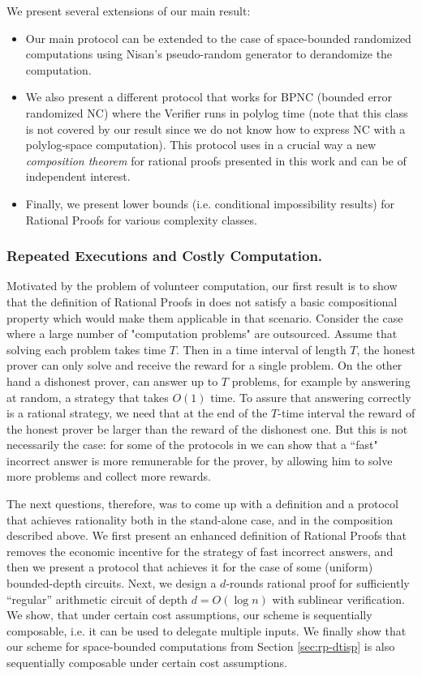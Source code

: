 We present several extensions of our main result:
\begin{itemize}
	
	\item Our main protocol can be extended to the case of space-bounded randomized computations using Nisan's 
	pseudo-random generator \cite{nisan1992pseudorandom} to derandomize the computation. 
	\item We also present a different protocol that works for BPNC (bounded error randomized NC) where the Verifier runs in polylog time (note that this class is not covered by our result since we do not know how to express NC with a polylog-space computation). This protocol uses in a crucial way a new {\em composition theorem} for rational proofs presented in this work and can be of independent interest. 
	\item Finally, we present lower bounds (i.e. conditional impossibility results) for Rational Proofs for various complexity classes.
\end{itemize}



\subsubsection{Repeated Executions and Costly Computation.}
Motivated by the problem of volunteer computation, our first
result is to show that the definition of Rational Proofs in \cite{am,am1} does not satisfy a basic compositional property which would make them applicable 
in that scenario. 
Consider the case where a large number of "computation problems" are outsourced. Assume that solving each problem takes time $T$. Then in a time interval of length $T$, the honest prover can only solve and receive the reward for a single problem. On the other hand a dishonest prover, can answer up to $T$ problems, for example by answering at random, a strategy that takes $O(1)$ time. To assure that answering correctly is a rational strategy, we 
need that at the end of the $T$-time interval the reward of the honest prover be larger than the reward of the dishonest one. But this is not necessarily the case: for some of the protocols in \cite{am,am1,ratargs} we can show that a ``fast" incorrect answer is more remunerable for the prover, by allowing him to solve more problems and collect more rewards.

The next questions, therefore, was to come up with a definition and a protocol that achieves rationality both in the stand-alone case, and in the composition
described above.  We first present an enhanced definition of Rational Proofs that removes the economic incentive  for the strategy of fast incorrect answers, and then we present a protocol that achieves it for the case of some (uniform) bounded-depth circuits.
Next, we design a $d$-rounds rational proof for sufficiently ``regular'' arithmetic circuit of depth $d = O(\log{n})$
with sublinear verification. We show, that under certain cost assumptions, our scheme is sequentially composable,
i.e. it can be used to delegate multiple inputs. We finally show that our scheme for space-bounded computations from Section \ref{sec:rp-dtisp} is also 
sequentially composable under certain cost assumptions.


